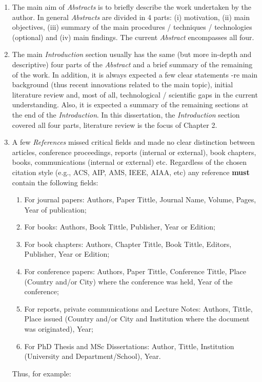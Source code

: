 \documentclass[14pt,twoside]{report}
\begin{document}
\begin{enumerate}
\item The main aim of {\it Abstracts} is to briefly describe the work undertaken by the author. In general {\it Abstracts} are divided in 4 parts: (i) motivation, (ii) main objectives, (iii) summary of the main procedures / techniques / technologies (optional) and (iv) main findings. The current {\it Abstract} encompasses all four.
%
\item The main {\it Introduction} section usually has the same (but more in-depth and descriptive) four parts of the {\it Abstract} and a brief summary of the remaining of the work. In addition, it is always expected a few clear statements -re main background (thus recent innovations related to the main topic), initial literature review and, most of all, technological / scientific gaps in the current understanding. Also, it is expected a summary of the remaining sections at the end of the {\it Introduction}. In this dissertation, the {\it Introduction} section covered all four parts, literature review is the focus of Chapter 2.  
%
\item A few {\it References} missed critical fields and made no clear distinction between articles, conference proceedings, reports (internal or external), book chapters, books, communications (internal or external) etc. Regardless of the chosen citation style (e.g., ACS, AIP, AMS, IEEE, AIAA, etc) any reference {\bf must} contain the following fields: 
\begin{enumerate}
\item For journal papers: Authors, Paper Tittle, Journal Name, Volume, Pages, Year of publication;
\item For books: Authors, Book Tittle, Publisher, Year or Edition;
\item For book chapters: Authors, Chapter Tittle, Book Tittle, Editors, Publisher, Year or Edition;
\item For conference papers: Authors, Paper Tittle, Conference Tittle, Place (Country and/or City) where the conference was held, Year of the conference;
\item For reports,  private communications and Lecture Notes: Authors, Tittle, Place issued (Country and/or City and Institution where the document was originated), Year;
\item For PhD Thesis and MSc Dissertations: Author, Tittle, Institution (University and Department/School), Year.
\end{enumerate}  
Thus, for example:
\begin{enumerate}[label={[\arabic*]}]

\end{enumerate}
\end{enumerate}
\end{document}
